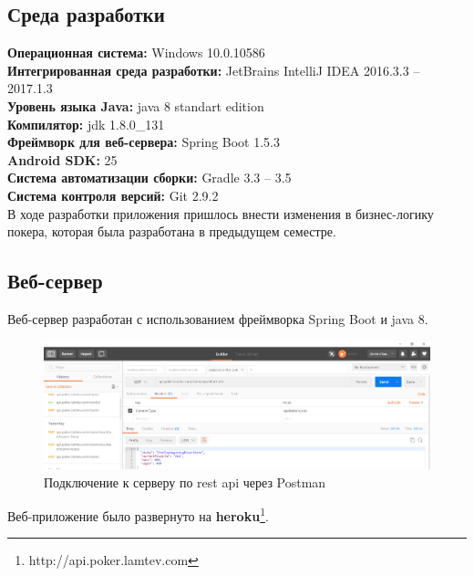 \subsection*{Среда разработки}

\noindent\textbf{Операционная система:} Windows 10.0.10586\\
\textbf{Интегрированная среда разработки:} JetBrains IntelliJ IDEA 2016.3.3 -- 2017.1.3\\
\textbf{Уровень языка Java:} java 8 standart edition\\
\textbf{Компилятор:} jdk 1.8.0\_131\\
\textbf{Фреймворк для веб-сервера:} Spring Boot 1.5.3\\
\textbf{Android SDK:} 25\\
\textbf{Система автоматизации сборки:} Gradle 3.3 -- 3.5\\
\textbf{Система контроля версий:} Git 2.9.2\\

В ходе разработки приложения пришлось внести изменения в бизнес-логику покера, которая была разработана в предыдущем семестре.

\subsection*{Веб-сервер}

Веб-сервер разработан с использованием фреймворка Spring Boot и java 8.

\begin{figure}[H]
	\begin{center}
		\includegraphics[scale=0.35]{pics/impl_rest}
	    \caption{Подключение к серверу по rest api через Postman} 
		\label{pic:gui:6}
	\end{center}
\end{figure}

Веб-приложение было развернуто на \textbf{heroku}\footnote{http://api.poker.lamtev.com}. 


